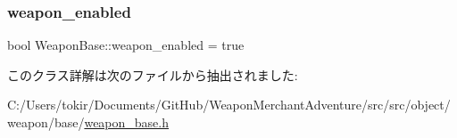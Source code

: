 \subsubsection{\texorpdfstring{weapon\+\_\+enabled}{weapon\_enabled}}
{\footnotesize\ttfamily bool Weapon\+Base\+::weapon\+\_\+enabled = true}



このクラス詳解は次のファイルから抽出されました\+:\begin{DoxyCompactItemize}
\item 
C\+:/\+Users/tokir/\+Documents/\+Git\+Hub/\+Weapon\+Merchant\+Adventure/src/src/object/weapon/base/\mbox{\hyperlink{weapon__base_8h}{weapon\+\_\+base.\+h}}\end{DoxyCompactItemize}
